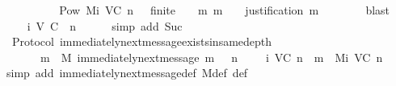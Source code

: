 \begin{isabellebody}
\ \ \isamarkupfalse%
\ \isamarkupfalse%
\ \ {\isachardoublequoteopen}{\isasymsigma}\ {\isasymin}\ {\isacharbraceleft}{\isasymsigma}\ {\isasymin}\ Pow\ {\isacharparenleft}Mi\ {\isacharparenleft}V{\isacharcomma}C{\isacharcomma}{\isasymepsilon}{\isacharparenright}\ {\isacharparenleft}n\ {\isacharminus}\ {}{\isacharparenright}{\isacharparenright}{\isachardot}\ finite\ {\isasymsigma}\ {\isasymand}\ {\isacharparenleft}{\isasymforall}\ m{\isachardot}\ m\ {\isasymin}\ {\isasymsigma}\ {\isasymlongrightarrow}\ justification\ m\ {\isasymsubseteq}\ {\isasymsigma}{\isacharparenright}{\isacharbraceright}{\isachardoublequoteclose}\isanewline
\ \ \ \ \isamarkupfalse%
\ blast\isanewline
\ \ \isamarkupfalse%
\ \isamarkupfalse%
\ {\isachardoublequoteopen}{\isasymsigma}\ {\isasymin}\ {\isasymSigma}i\ {\isacharparenleft}V{\isacharcomma}\ C{\isacharcomma}\ {\isasymepsilon}{\isacharparenright}\ n{\isachardoublequoteclose}\isanewline
\ \ \ \ \isamarkupfalse%
\ {\isacharparenleft}simp\ add{\isacharcolon}\ Suc{\isacharparenright}\isanewline
\ \ \isamarkupfalse%
\isanewline
{}\isamarkupfalse%
%
\endisatagproof
{\isafoldproof}%
%
\isadelimproof
\isanewline
%
\endisadelimproof
\isanewline
{}\isamarkupfalse%
\ {\isacharparenleft}\ Protocol{\isacharparenright}\ immediately{\isacharunderscore}next{\isacharunderscore}message{\isacharunderscore}exists{\isacharunderscore}in{\isacharunderscore}same{\isacharunderscore}depth{\isacharcolon}\ \isanewline
\ \ {\isachardoublequoteopen}{\isasymforall}\ {\isasymsigma}\ {\isasymin}\ {\isasymSigma}{\isachardot}\ {\isasymforall}\ m\ {\isasymin}\ M{\isachardot}\ immediately{\isacharunderscore}next{\isacharunderscore}message\ {\isacharparenleft}{\isasymsigma}{\isacharcomma}m{\isacharparenright}\ {\isasymlongrightarrow}\ {\isacharparenleft}{\isasymexists}\ n\ {\isasymin}\ {\isasymnat}{\isachardot}\ {\isasymsigma}\ {\isasymin}\ {\isasymSigma}i\ {\isacharparenleft}V{\isacharcomma}C{\isacharcomma}{\isasymepsilon}{\isacharparenright}\ n\ {\isasymand}\ m\ {\isasymin}\ Mi\ {\isacharparenleft}V{\isacharcomma}C{\isacharcomma}{\isasymepsilon}{\isacharparenright}\ n{\isacharparenright}{\isachardoublequoteclose}\isanewline
%
\isadelimproof
\ \ %
\endisadelimproof
%
\isatagproof
{}\isamarkupfalse%
\ {\isacharparenleft}simp\ add{\isacharcolon}\ immediately{\isacharunderscore}next{\isacharunderscore}message{\isacharunderscore}def\ M{\isacharunderscore}def\ {\isasymSigma}{\isacharunderscore}def{\isacharparenright}\isanewline

\end{isabellebody}
